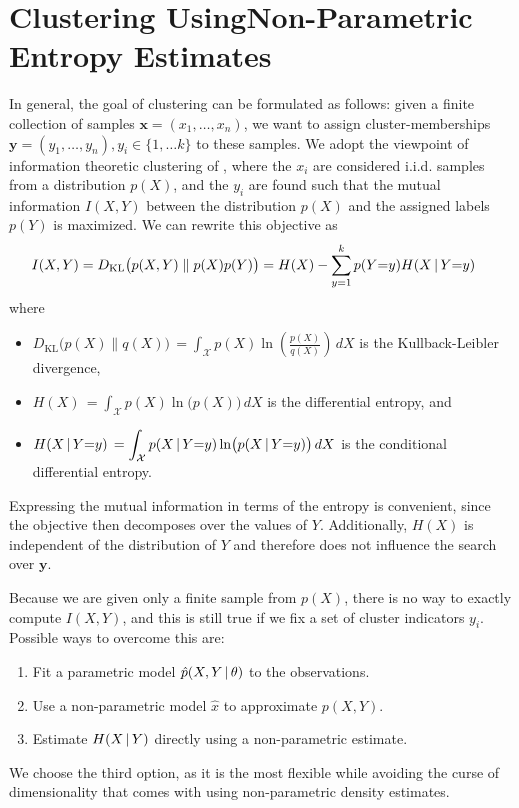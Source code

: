 \section[Clustering Using Non-Parametric Entropy Estimates]{Clustering Using\linebreak Non-Parametric Entropy Estimates}
In general, the goal of clustering can be formulated as follows: 
given a finite collection of samples $\mathbf{x} = (x_1, \dotsc, x_n)$, we want to 
assign cluster-memberships $\mathbf{y} = (y_1, \dotsc, y_n ), y_i \in \{1, \dotsc k\}$ to these samples.
%
We adopt the viewpoint of information theoretic clustering of \citet{gokcay2002information}, 
where the $x_i$ are considered i.i.d{.} samples from a distribution $p(X)$, and the 
$y_i$ are found such that the mutual information $I(X, Y)$ between the distribution $p(X)$ and the
assigned labels $p(Y)$ is maximized.
We can rewrite this objective as 
\begin{align}
         I(X, Y)
        &= D_{\text{KL}}\bigl(p(X, Y) \parallel p(X) p(Y)\bigr) = H(X) - \sum_{y=1}^k p(Y{=}y) H(X \, | \, Y {=} y)
\end{align}
where
\begin{itemize}
    \item $\displaystyle D_\text{KL}\bigl(p(X) \parallel q(X)\bigr)\, = \int_\mathcal{X} p(X) \ln\left(\frac{p(X)}{q(X)}\right)\,dX$ is the Kullback-Leibler divergence,
    \item $\displaystyle H(X)\, = \int_\mathcal{X} p(X) \ln\bigl(p(X)\bigr)\,dX$ is the differential entropy, and
    \item $\displaystyle H(X \, | \, Y{=}y)\, = \int_\mathcal{X} p(X \, | \, Y {=}y) \ln\bigl(p(X \, | \, Y {=} y)\bigr)\,dX$ is the conditional differential entropy.
    \end{itemize}
Expressing the mutual information in terms of the entropy is convenient, since
the objective then decomposes over the values of $Y$. 
%
Additionally, $H(X)$ is independent of the distribution of $Y$ and therefore
does not influence the search over $\mathbf{y}$.

Because we are given only a finite sample from $p(X)$, there is no way to
exactly compute $I(X, Y)$, and this is still true if we fix a set of cluster
indicators $y_i$.
%
Possible ways to overcome this are:
\begin{enumerate}
    \item Fit a parametric model $\hat{p}(X, Y \, | \, \theta)$ to the observations.
    \item Use a non-parametric model $\hat{x}$ to approximate $p(X, Y)$. 
    \item Estimate $H(X \, | \, Y)$ directly using a non-parametric estimate.
\end{enumerate}
We choose the third option, as it is the most flexible while avoiding
the curse of dimensionality that comes with using non-parametric density estimates.

